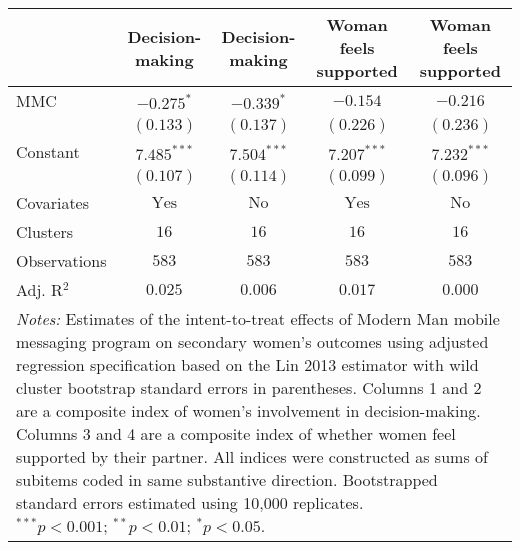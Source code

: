
\begin{tabular}{l c c c c}
\toprule
 & Decision-making & Decision-making & Woman feels supported & Woman feels supported \\
\midrule
MMC          & $-0.275^{*}$   & $-0.339^{*}$  & $-0.154$       & $-0.216$      \\
             & $(0.133)$      & $(0.137)$     & $(0.226)$      & $(0.236)$     \\
Constant     & $7.485^{***}$  & $7.504^{***}$ & $7.207^{***}$  & $7.232^{***}$ \\
             & $(0.107)$      & $(0.114)$     & $(0.099)$      & $(0.096)$     \\
\midrule
Covariates   & $\textrm{Yes}$ & $\textrm{No}$ & $\textrm{Yes}$ & $\textrm{No}$ \\
Clusters     & $16$           & $16$          & $16$           & $16$          \\
Observations & $583$          & $583$         & $583$          & $583$         \\
Adj. R$^2$   & $0.025$        & $0.006$       & $0.017$        & $0.000$       \\
\bottomrule
\multicolumn{5}{l}{\scriptsize{\parbox{\linewidth}{\vspace{2pt}
       \textit{Notes:} Estimates of the intent-to-treat effects of Modern Man mobile
       messaging program on secondary women's outcomes using adjusted regression
       specification based on the Lin 2013 estimator with wild cluster bootstrap
       standard errors in parentheses. Columns 1 and 2 are a composite index of
       women's involvement in decision-making. Columns 3 and 4 are a composite index of 
       whether women feel supported by their partner. All indices were constructed as sums of 
       subitems coded in same substantive direction. Bootstrapped standard errors estimated 
       using 10,000 replicates. \\ $^{***}p<0.001$; $^{**}p<0.01$; $^{*}p<0.05$.}}}
\end{tabular}
